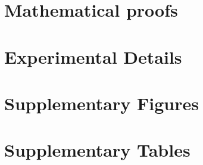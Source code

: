 \documentclass{article}
\theoremstyle{plain}
\theoremstyle{definition}
\theoremstyle{remark}
\begin{document}
\setcounter{equation}{0}
\setcounter{figure}{0}
\setcounter{table}{0}
\makeatletter
\renewcommand{\theequation}{S\arabic{equation}}
\renewcommand{\thefigure}{S\arabic{figure}}
\renewcommand{\bibnumfmt}[1]{[S#1]}
\renewcommand{\citenumfont}[1]{S#1}

\section{Mathematical proofs}
\label{sec-proof-statements}


%

\section{Experimental Details}
\label{sec-experimental-details}


\section{Supplementary Figures}
\label{sec-supp-figures}


\section{Supplementary Tables}
\label{sec-supp-tables}



\end{document}
